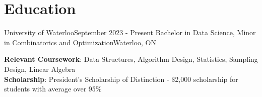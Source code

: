 \section{Education}
  \resumeSubHeadingListStart
    \resumeSubheading
      {University of Waterloo}{September 2023 - Present}
      {Bachelor in Data Science, Minor in Combinatorics and Optimization}{Waterloo, ON}
      
  \begin{itemize}[leftmargin=0.15in, label={}]
    \small{\item{
      	\textbf{Relevant Coursework}{: Data Structures, Algorithm Design, Statistics, Sampling Design, Linear Algebra} \\
      	\textbf{Scholarship}{: President's Scholarship of Distinction - \$2,000 scholarship for students with average over 95\%}
    }}
  \end{itemize}
  \resumeSubHeadingListEnd
